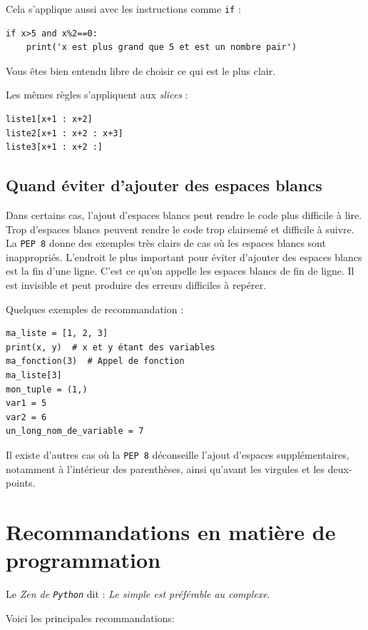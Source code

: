 \documentclass[a4paper,11pt]{book}
\begin{document}
Cela s'applique aussi avec les instructions comme \texttt{if} :
\begin{lstlisting}
if x>5 and x%2==0:
    print('x est plus grand que 5 et est un nombre pair')
\end{lstlisting}

Vous êtes bien entendu libre de choisir ce qui est le plus clair.
\medskip

Les mêmes règles s'appliquent aux \textit{slices} : 
\begin{lstlisting}
liste1[x+1 : x+2]
liste2[x+1 : x+2 : x+3]
liste3[x+1 : x+2 :]
\end{lstlisting}
\medskip

\subsection*{Quand éviter d'ajouter des espaces blancs}
Dans certains cas, l'ajout d'espaces blancs peut rendre le code plus difficile à lire. Trop d'espaces blancs peuvent rendre le code trop clairsemé et difficile à suivre. La \texttt{PEP 8} donne des exemples très clairs de cas où les espaces blancs sont inappropriés. L'endroit le plus important pour éviter d'ajouter des espaces blancs est la fin d'une ligne. C'est ce qu'on appelle les espaces blancs de fin de ligne. Il est invisible et peut produire des erreurs difficiles à repérer.
\medskip

Quelques exemples de recommandation :
\begin{lstlisting}
ma_liste = [1, 2, 3]
print(x, y)  # x et y étant des variables
ma_fonction(3)  # Appel de fonction
ma_liste[3]
mon_tuple = (1,)
var1 = 5
var2 = 6
un_long_nom_de_variable = 7
\end{lstlisting}
\medskip

Il existe d'autres cas où la \texttt{PEP 8} déconseille l'ajout d'espaces supplémentaires, notamment à l'intérieur des parenthèses, ainsi qu'avant les virgules et les deux-points.
\medskip

\section{Recommandations en matière de programmation
}
Le \textit{Zen de \texttt{Python}} dit : \og \textit{Le simple est préférable au complexe}\fg{}.
\medskip

Voici les principales recommandations:
\medskip
\end{document}

